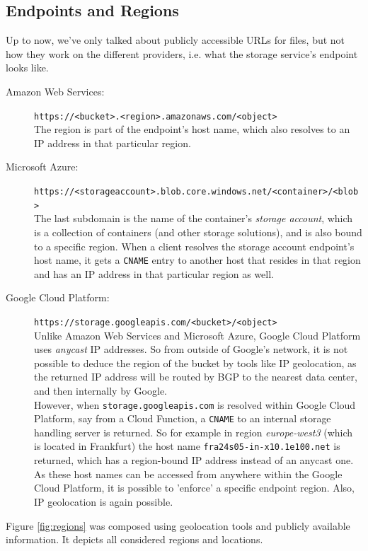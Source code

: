 \documentclass[a4paper,bibliography=totoc]{scrartcl}
\newcommand{\Azure}{Microsoft Azure\xspace}
\newcommand{\GCP}{Google Cloud Platform\xspace}
\newcommand{\AWS}{Amazon Web Services\xspace}
\begin{document}
\subsection{Endpoints and Regions}\label{sec:endpoints}
Up to now, we've only talked about publicly accessible URLs for files, but not how they work on the different providers, i.e. what the storage service's endpoint looks like.
\begin{description}
    \item[\AWS:] \texttt{https://<bucket>.<region>.amazonaws.com/<object>}\cite{aws_s3_access}\\
    The region is part of the endpoint's host name, which also resolves to an IP address in that particular region. 
    \item[\Azure:] \texttt{https://<storageaccount>.blob.core.windows.net/<container>/<blob>}\cite{azure_storage_access}\\
    The last subdomain is the name of the container's \textit{storage account}, which is a collection of containers (and other storage solutions), and is also bound to a specific region.\cite{azure_storage_accounts} When a client resolves the storage account endpoint's host name, it gets a \texttt{CNAME} entry to another host that resides in that region and has an IP address in that particular region as well.
    \item[\GCP:] \texttt{https://storage.googleapis.com/<bucket>/<object>}\cite{gcp_storage_acces}\\
    Unlike \AWS and \Azure, \GCP uses \textit{anycast} IP addresses.\cite{cloudflare_anycast} So from outside of Google's network, it is not possible to deduce the region of the bucket by tools like IP geolocation, as the returned IP address will be routed by BGP to the nearest data center, and then internally by Google.\\
    However, when \texttt{storage.googleapis.com} is resolved within \GCP, say from a Cloud Function, a \texttt{CNAME} to an internal storage handling server is returned. So for example in region \textit{europe-west3} (which is located in Frankfurt) the host name \texttt{fra24s05-in-x10.1e100.net} is returned, which has a region-bound IP address instead of an anycast one. As these host names can be accessed from anywhere within the \GCP, it is possible to 'enforce' a specific endpoint region. Also, IP geolocation is again possible.
\end{description}
Figure \ref{fig:regions} was composed using geolocation tools and publicly available information.\cite{aws_regions,azure_regions,gcp_regions} It depicts all considered regions and locations.
\end{document}
